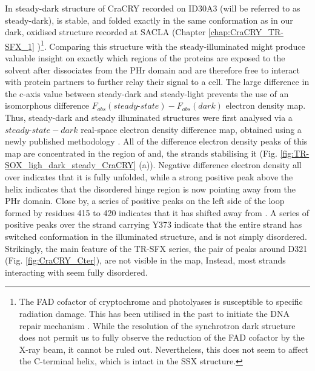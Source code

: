 In steady-dark structure of CraCRY recorded on ID30A3 (will be referred to as steady-dark),  is stable, and folded exactly in the same conformation as in our dark, oxidised structure recorded at SACLA (Chapter \ref{chap:CraCRY_TR-SFX_1} )\footnote{The FAD cofactor of cryptochrome and photolyases is susceptible to specific radiation damage. This has been utilised in the past to initiate the DNA repair mechanism \parencite{meesCrystalStructurePhotolyase2004}. While the resolution of the synchrotron dark structure does not permit us to fully observe the reduction of the FAD cofactor by the X-ray beam, it cannot be ruled out. Nevertheless, this does not seem to affect the C-terminal helix, which is intact in the SSX structure.}.  Comparing this structure with the steady-illuminated might produce valuable insight on exactly which regions of the proteins are exposed to the solvent after  dissociates from the PHr domain and are therefore free to interact with protein partners to further relay their signal to a cell. 
\vspace{2mm}
The large difference in the c-axis value between steady-dark and steady-light prevents the use of an isomorphous difference \(F_{obs}(steady\mbox{-}state) - F_{obs}(dark)\) electron density map. Thus, steady-dark and steady illuminated structures were first analysed via a \(steady\mbox{-}state - dark\) real-space electron density difference map, obtained using a newly published methodology \parencite{brooknerMatchMapsNonisomorphousDifference2024}. 
\vspace{2mm}
All of the difference electron density peaks of this map are concentrated in the region of  and, the strands stabilising it (Fig. \ref{fig:TR-SOX_ligh_dark_steady_CraCRY} (a)). Negative difference electron density all over  indicates that it is fully unfolded, while a strong positive peak above the helix indicates that the disordered hinge region is now pointing away from the PHr domain. Close by, a series of positive peaks on the left side of the loop formed by residues 415 to 420 indicates that it has shifted away from . A series of positive peaks over the strand carrying Y373 indicate that the entire strand has switched conformation in the illuminated structure, and is not simply disordered. Strikingly, the main feature of the TR-SFX series, the pair of peaks around D321 (Fig. \ref{fig:CraCRY_Cter}), are not visible in the map, Instead, most strands interacting with  seem fully disordered. 

